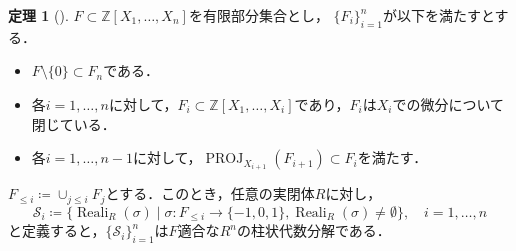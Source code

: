 \documentclass[uplatex, dvipdfmx]{jsarticle}
\numberwithin{equation}{section}
\newcommand{\Z}{\mathbb{Z}}
\newcommand{\map}[3]{{#1}\colon{#2}\rightarrow{#3}}
\DeclareMathOperator{\PROJ}{PROJ}
\DeclareMathOperator{\Reali}{Reali}
\theoremstyle{definition}
\newtheorem{theorem}[definition]{定理}
\begin{document}
\begin{theorem}[{\cite[Theorem 5.34]{MR2248869}}]\label{theorem:improved-cad}
     $F \subset \Z[X_1, \dots, X_n]$を有限部分集合とし，
     $\{F_i\}_{i=1}^n$が以下を満たすとする．
     \begin{itemize}
          \item $F \setminus \{0\} \subset F_n$である．\\
          \item 各$i=1,\dots, n$に対して，$F_i \subset \Z[X_1, \dots, X_i]$であり，$F_i$は$X_i$での微分について閉じている．\\
          \item 各$i=1, \dots, n-1$に対して，$\PROJ_{X_{i+1}}(F_{i+1}) \subset F_i$を満たす．
     \end{itemize}

     $F_{\leq i}\coloneqq \cup_{j \leq i} F_j$とする．このとき，任意の実閉体$R$に対し，
     \begin{equation}
          \mathcal{S}_i \coloneqq \{\Reali_R(\sigma) \mid \map{\sigma}{F_{\leq i}}{\{-1,0,1\}}, \Reali_R(\sigma) \neq \emptyset\}, \quad i=1, \dots, n 
     \end{equation}          
     と定義すると，$\{\mathcal{S}_i\}_{i=1}^n$は$F$適合な$R^n$の柱状代数分解である．
\end{theorem}
\end{document}
